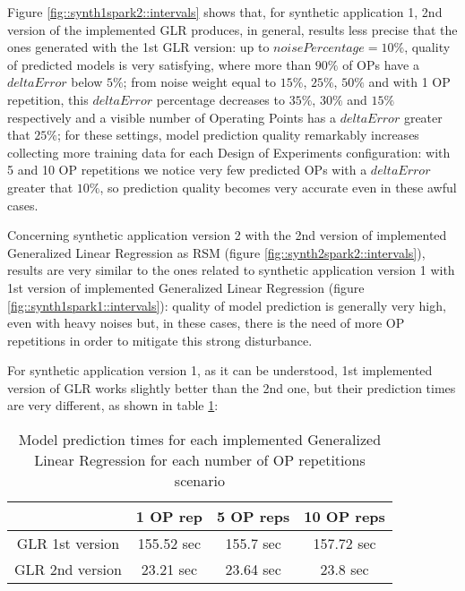 Figure \ref{fig::synth1spark2::intervals} shows that, for synthetic application 1, 2nd version of the implemented GLR produces, in general, results less precise that the ones generated with the 1st GLR version: up to $noisePercentage = 10\%$, quality of predicted models is very satisfying, where more than $90\%$ of OPs have a $deltaError$ below $5\%$; from noise weight equal to $15\%$, $25\%$, $50\%$ and with 1 OP repetition, this $deltaError$ percentage decreases to $35\%$, $30\%$ and $15\%$ respectively and a visible number of Operating Points has a $deltaError$ greater that $25\%$; for these settings, model prediction quality remarkably increases collecting more training data for each Design of Experiments configuration: with 5 and 10 OP repetitions we notice very few predicted OPs with a $deltaError$ greater that $10\%$, so prediction quality becomes very accurate even in these awful cases.

Concerning synthetic application version 2 with the 2nd version of implemented Generalized Linear Regression as RSM (figure \ref{fig::synth2spark2::intervals}), results are very similar to the ones related to synthetic application version 1 with 1st version of implemented Generalized Linear Regression (figure \ref{fig::synth1spark1::intervals}): quality of model prediction is generally very high, even with heavy noises but, in these cases, there is the need of more OP repetitions in order to mitigate this strong disturbance.

For synthetic application version 1, as it can be understood, 1st implemented version of GLR works slightly better than the 2nd one, but their prediction times are very different, as shown in table \ref{tab::GLRtimes}:

\begin{table}[h]

    \centering
    
    \begin{tabular}{cccc}
    
        \toprule
         & 1 OP rep & 5 OP reps & 10 OP reps \\
        \midrule
        GLR 1st version & 155.52 sec & 155.7 sec & 157.72 sec \\
        GLR 2nd version & 23.21 sec & 23.64 sec & 23.8 sec \\
        \bottomrule 
    
    \end{tabular}

    \caption{Model prediction times for each implemented Generalized Linear Regression for each number of OP repetitions scenario}
    \label{tab::GLRtimes}
    
\end{table}

